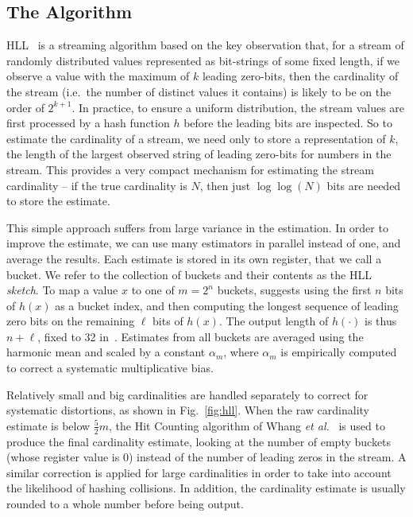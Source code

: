 \documentclass{article}
\begin{document}
\subsection{The Algorithm}
HLL~\cite{hll} is a streaming algorithm based on the key observation that, for a stream of randomly distributed values represented as bit-strings of some fixed length, if we observe a value with the maximum of $k$ leading zero-bits, then the cardinality of the stream (i.e.\ the number of distinct values it contains) is likely to be on the order of $2^{k+1}$. In practice, to ensure a uniform distribution, the stream values are first processed by a hash function $h$ before the leading bits are inspected. So to estimate the cardinality of a stream, we need only to store a representation of $k$, the length of the largest observed string of leading zero-bits for numbers in the stream. This provides a very compact mechanism for estimating the stream cardinality -- if the true cardinality is $N$, then just $\log\log(N)$ bits are needed to store the estimate.

This simple approach suffers from large variance in the estimation. In order to improve the estimate, we can use many estimators in parallel instead of one, and average the results. Each estimate is stored in its own register, that we call a bucket. We refer to the collection of buckets and their contents as the HLL \emph{sketch}. To map a value $x$ to one of $m=2^n$ buckets, \cite{loglog} suggests using the first $n$ bits of $h(x)$ as a bucket index, and then computing the longest sequence of leading zero bits on the remaining $\ell$ bits of $h(x)$. The output length of $h(\cdot)$ is thus $n+\ell$, fixed to 32 in~\cite{hll}. Estimates from all buckets are averaged using the harmonic mean and scaled by a constant $\alpha_m$, where $\alpha_m$ is empirically computed to correct a systematic multiplicative bias.

Relatively small and big cardinalities are handled separately to correct for systematic distortions, as shown in Fig.~\ref{fig:hll}. When the raw cardinality estimate is below $\frac{5}{2}m$, the Hit Counting algorithm of Whang \emph{et al.}~\cite{hitcounting} is used to produce the final cardinality estimate, looking at the number of empty buckets (whose register value is 0) instead of the number of leading zeros in the stream. A similar correction is applied for large cardinalities in order to take into account the likelihood of hashing collisions. In addition, the cardinality estimate is usually rounded to a whole number before being output. 
\end{document}
